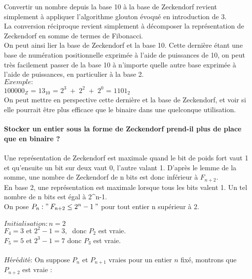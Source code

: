\documentclass{article}
\begin{document}
Convertir un nombre depuis la base 10 à la base de Zeckendorf revient simplement à appliquer l'algorithme glouton évoqué en introduction de 3. \\
La conversion réciproque revient simplement à décomposer la représentation de Zeckendorf en somme de termes de Fibonacci.\\
On peut ainsi lier la base de Zeckendorf et la base 10. Cette dernière étant une base de numération positionnelle exprimée à l'aide de puissances de 10, on peut très facilement passer  de la base 10 à n'importe quelle autre base exprimée à l'aide de puissances, en particulier à la base 2. \\

$Exemple :$\\
$100000_Z$ = $13_{10}$ = $2^{3}\;+\;2^{2}\;+\;2^{0}$ = $1101_2$\\

On peut mettre en perspective cette dernière et la base de Zeckendorf, et voir si elle pourrait être plus efficace que le binaire dans une quelconque utilisation.\\\\



\textbf{Stocker un entier sous la forme de Zeckendorf prend-il plus de place que en binaire ?}\\\\




Une représentation de Zeckendorf est maximale quand le bit de poids fort vaut 1 et qu'ensuite un bit sur deux vaut 0, l'autre valant 1.
D'après le lemme de la somme, une nombre de Zeckendorf de n bits est donc inférieur à $F_{n+2}$.\\
En base 2, une représentation est maximale lorsque tous les bits valent 1.
Un tel nombre de n bits est égal à 2^n-1.\\



On pose $ P_n : "\:F_{n+2} \leq 2^{n}-1\:"$ pour tout entier n supérieur à 2.\\
\\
$Initialisation : n = 2$\\

$F_4 = 3$ et $2^2 -1 = 3, \;$
donc $ P_2$ est vraie.\\

$F_5 = 5$ et $2^3 -1 = 7$
donc $ P_3$ est vraie.\\
 \\
$Hérédité $: On suppose $P_n$ et $P_{n+1}$ vraies pour un entier $n$ fixé, montrons que $P_{n+2}$ est vraie : \\
\end{document}
